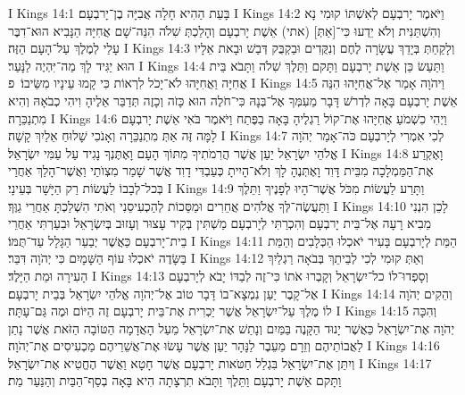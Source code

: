 I Kings 14:1	בָּעֵת הַהִיא חָלָה אֲבִיָּה בֶן־יָרבְעָם׃
I Kings 14:2	וַיֹּאמֶר יָרבְעָם לְאִשְׁתּוֹ קוּמִי נָא וְהִשְׁתַּנִּית וְלֹא יֵדְעוּ כִּי־[אַתְּ] (אתי) אֵשֶׁת יָרבְעָם וְהָלַכְתְּ שִׁלֹה הִנֵּה־שָׁם אֲחִיָּה הַנָּבִיא הוּא־דִבֶּר עָלַי לְמֶלֶךְ עַל־הָעָם הַזֶּה׃
I Kings 14:3	וְלָקַחַתְּ בְּיָדֵךְ עֲשָׂרָה לֶחֶם וְנִקֻּדִים וּבַקְבֻּק דְּבַשׁ וּבָאת אֵלָיו הוּא יַגִּיד לָךְ מַה־יִּהְיֶה לַנָּעַר׃
I Kings 14:4	וַתַּעַשׂ כֵּן אֵשֶׁת יָרבְעָם וַתָּקם וַתֵּלֶךְ שִׁלֹה וַתָּבֹא בֵּית אֲחִיָּה וַאֲחִיָּהוּ לֹא־יָכֹל לִרְאוֹת כִּי קָמוּ עֵינָיו מִשֵּׂיבוֹ׃ {פ}
I Kings 14:5	וַיהֹוָה אָמַר אֶל־אֲחִיָּהוּ הִנֵּה אֵשֶׁת יָרבְעָם בָּאָה לִדְרֹשׁ דָּבָר מֵעִמְּךָ אֶל־בְּנָהּ כִּי־חֹלֶה הוּא כָּזֹה וְכָזֶה תְּדַבֵּר אֵלֶיהָ וִיהִי כְבֹאָהּ וְהִיא מִתְנַכֵּרָה׃
I Kings 14:6	וַיְהִי כִשְׁמֹעַ אֲחִיָּהוּ אֶת־קוֹל רַגְלֶיהָ בָּאָה בַפֶּתַח וַיֹּאמֶר בֹּאִי אֵשֶׁת יָרבְעָם לָמָּה זֶּה אַתְּ מִתְנַכֵּרָה וְאָנֹכִי שָׁלוּחַ אֵלַיִךְ קָשָׁה׃
I Kings 14:7	לְכִי אִמְרִי לְיָרבְעָם כֹּה־אָמַר יְהֹוָה אֱלֹהֵי יִשְׂרָאֵל יַעַן אֲשֶׁר הֲרִמֹתִיךָ מִתּוֹךְ הָעָם וָאֶתֶּנְךָ נָגִיד עַל עַמִּי יִשְׂרָאֵל׃
I Kings 14:8	וָאֶקְרַע אֶת־הַמַּמְלָכָה מִבֵּית דָּוִד וָאֶתְּנֶהָ לָךְ וְלֹא־הָיִיתָ כְּעַבְדִּי דָוִד אֲשֶׁר שָׁמַר מִצְוֺתַי וַאֲשֶׁר־הָלַךְ אַחֲרַי בְּכל־לְבָבוֹ לַעֲשׂוֹת רַק הַיָּשָׁר בְּעֵינָי׃
I Kings 14:9	וַתָּרַע לַעֲשׂוֹת מִכֹּל אֲשֶׁר־הָיוּ לְפָנֶיךָ וַתֵּלֶךְ וַתַּעֲשֶׂה־לְּךָ אֱלֹהִים אֲחֵרִים וּמַסֵּכוֹת לְהַכְעִיסֵנִי וְאֹתִי הִשְׁלַכְתָּ אַחֲרֵי גַוֶּךָ׃
I Kings 14:10	לָכֵן הִנְנִי מֵבִיא רָעָה אֶל־בֵּית יָרבְעָם וְהִכְרַתִּי לְיָרבְעָם מַשְׁתִּין בְּקִיר עָצוּר וְעָזוּב בְּיִשְׂרָאֵל וּבִעַרְתִּי אַחֲרֵי בֵית־יָרבְעָם כַּאֲשֶׁר יְבַעֵר הַגָּלָל עַד־תֻּמּוֹ׃
I Kings 14:11	הַמֵּת לְיָרבְעָם בָּעִיר יֹאכְלוּ הַכְּלָבִים וְהַמֵּת בַּשָּׂדֶה יֹאכְלוּ עוֹף הַשָּׁמָיִם כִּי יְהֹוָה דִּבֵּר׃
I Kings 14:12	וְאַתְּ קוּמִי לְכִי לְבֵיתֵךְ בְּבֹאָה רַגְלַיִךְ הָעִירָה וּמֵת הַיָּלֶד׃
I Kings 14:13	וְסָפְדוּ־לוֹ כל־יִשְׂרָאֵל וְקָבְרוּ אֹתוֹ כִּי־זֶה לְבַדּוֹ יָבֹא לְיָרבְעָם אֶל־קָבֶר יַעַן נִמְצָא־בוֹ דָּבָר טוֹב אֶל־יְהֹוָה אֱלֹהֵי יִשְׂרָאֵל בְּבֵית יָרבְעָם׃
I Kings 14:14	וְהֵקִים יְהֹוָה לוֹ מֶלֶךְ עַל־יִשְׂרָאֵל אֲשֶׁר יַכְרִית אֶת־בֵּית יָרבְעָם זֶה הַיּוֹם וּמֶה גַּם־עָתָּה׃
I Kings 14:15	וְהִכָּה יְהֹוָה אֶת־יִשְׂרָאֵל כַּאֲשֶׁר יָנוּד הַקָּנֶה בַּמַּיִם וְנָתַשׁ אֶת־יִשְׂרָאֵל מֵעַל הָאֲדָמָה הַטּוֹבָה הַזֹּאת אֲשֶׁר נָתַן לַאֲבוֹתֵיהֶם וְזֵרָם מֵעֵבֶר לַנָּהָר יַעַן אֲשֶׁר עָשׂוּ אֶת־אֲשֵׁרֵיהֶם מַכְעִיסִים אֶת־יְהֹוָה׃
I Kings 14:16	וְיִתֵּן אֶת־יִשְׂרָאֵל בִּגְלַל חַטֹּאות יָרבְעָם אֲשֶׁר חָטָא וַאֲשֶׁר הֶחֱטִיא אֶת־יִשְׂרָאֵל׃
I Kings 14:17	וַתָּקם אֵשֶׁת יָרבְעָם וַתֵּלֶךְ וַתָּבֹא תִרְצָתָה הִיא בָּאָה בְסַף־הַבַּיִת וְהַנַּעַר מֵת׃
